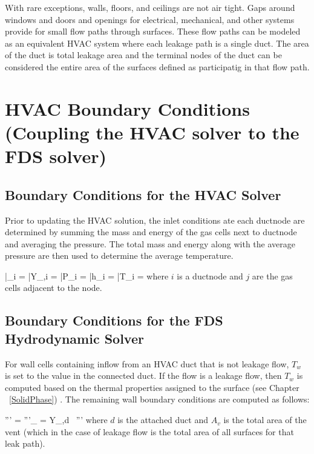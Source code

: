 With rare exceptions, walls, floors, and ceilings are not air tight.  Gaps around windows and doors and openings for electrical, mechanical, and other systems provide for small flow paths through surfaces.  These flow paths can be modeled as an equivalent HVAC system where each leakage path is a single duct.  The area of the duct is total leakage area and the terminal nodes of the duct can be considered the entire area of the surfaces defined as participatig in that flow path.

\section{HVAC Boundary Conditions (Coupling the HVAC solver to the FDS solver)}

\subsection{Boundary Conditions for the HVAC Solver}

Prior to updating the HVAC solution, the inlet conditions ate each ductnode are determined by summing the mass and energy of the gas cells next to ductnode and averaging the pressure.  The total mass and energy along with the average pressure are then used to determine the average temperature.


\be \bar{\rho}_i =   \ee
\be \bar{Y}_{\alpha,i} =   \ee
\be \bar{P}_i =   \ee
\be \bar{h}_i =   \ee
\be \bar{T}_i =  \ee
where $i$ is a ductnode and $j$ are the gas cells adjacent to the node.

\subsection{Boundary Conditions for the FDS Hydrodynamic Solver}

For wall cells containing inflow from an HVAC duct that is not leakage flow, $T_w$ is set to the value in the connected duct.  If the flow is a leakage flow, then $T_w$ is computed based on the thermal properties assigned to the surface (see Chapter ~\ref{SolidPhase}) .  The remaining wall boundary conditions are computed as follows:

\be {}''' =  \ee
\be {}'''_{\alpha} = Y_{\alpha,d} \, ''' \ee
where $d$ is the attached duct and $A_v$ is the total area of the vent (which in the case of leakage flow is the total area of all surfaces for that leak path).

